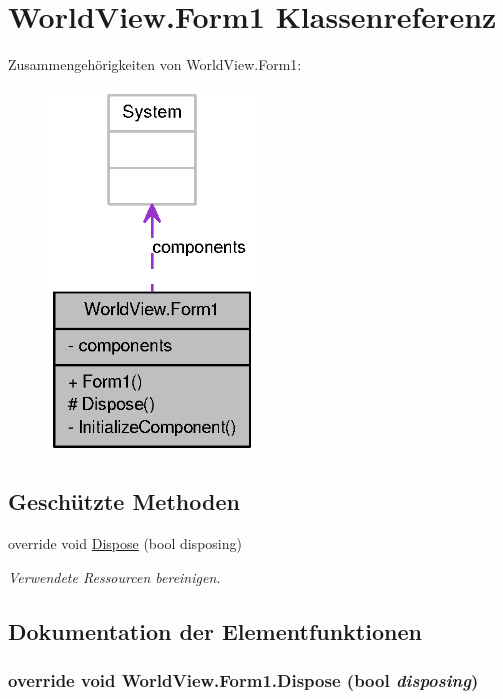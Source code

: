 \hypertarget{class_world_view_1_1_form1}{
\section{WorldView.Form1 Klassenreferenz}
\label{class_world_view_1_1_form1}
}


Zusammengehörigkeiten von WorldView.Form1:\nopagebreak
\begin{figure}[H]
\begin{center}
\leavevmode
\includegraphics[width=156pt]{class_world_view_1_1_form1__coll__graph}
\end{center}
\end{figure}
\subsection*{Geschützte Methoden}
\begin{DoxyCompactItemize}
\item 
override void \hyperlink{class_world_view_1_1_form1_aa2333690531ec36db8de10f254217640}{Dispose} (bool disposing)
\begin{DoxyCompactList}\small\item\em Verwendete Ressourcen bereinigen. \item\end{DoxyCompactList}\end{DoxyCompactItemize}


\subsection{Dokumentation der Elementfunktionen}
\hypertarget{class_world_view_1_1_form1_aa2333690531ec36db8de10f254217640}{
\subsubsection[{Dispose}]{\setlength{\rightskip}{0pt plus 5cm}override void WorldView.Form1.Dispose (bool {\em disposing})}}
\label{class_world_view_1_1_form1_aa2333690531ec36db8de10f254217640}


